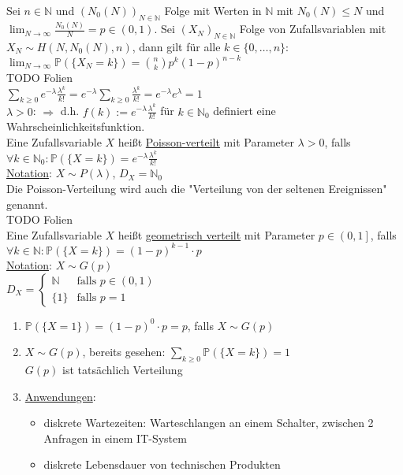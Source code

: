 \documentclass[a4paper]{article}
\newcommand{\ul}{\underline}
\begin{document}
Sei $n\in\mathbb{N}$ und $(N_0(N))_{N\in\mathbb{N}}$ Folge mit Werten in $\mathbb{N}$ mit $N_0(N)\leq N$ und $\lim_{N\rightarrow\infty}\frac{N_0(N)}{N}=p\in(0,1)$. Sei $(X_N)_{N\in\mathbb{N}}$ Folge von Zufallsvariablen mit $X_N\sim H(N,N_0(N),n)$, dann gilt für alle $k\in\{0,\dots,n\}$: $\lim_{N\rightarrow\infty}\mathbb{P}(\{X_N=k\})=\binom{n}{k}p^k(1-p)^{n-k}$\\
TODO Folien\\
$\sum_{k\geq 0}e^{-\lambda}\frac{\lambda^k}{k!}=e^{-\lambda}\sum_{k\geq 0}\frac{\lambda^k}{k!}=e^{-\lambda}e^{\lambda}=1$\\
\ul{$\lambda>0$}: $\Rightarrow$ d.h. $f(k):=e^{-\lambda}\frac{\lambda^k}{k!}$ für $k\in\mathbb{N}_0$ definiert eine Wahrscheinlichkeitsfunktion.\\
Eine Zufallsvariable $X$ heißt \ul{Poisson-verteilt} mit Parameter $\lambda>0$, falls $\forall k\in\mathbb{N}_0:\mathbb{P}(\{X=k\})=e^{-\lambda}\frac{\lambda^k}{k!}$\\
\ul{Notation}: $X\sim P(\lambda)$, $D_X=\mathbb{N}_0$\\
Die Poisson-Verteilung wird auch die "Verteilung von der seltenen Ereignissen" genannt.\\
TODO Folien\\
Eine Zufallsvariable $X$ heißt \ul{geometrisch verteilt} mit Parameter $p\in\left(0,1\right]$, falls $\forall k\in\mathbb{N}:\mathbb{P}(\{X=k\})=(1-p)^{k-1}\cdot p$\\
\ul{Notation}: $X\sim G(p)$\\
$D_X=\begin{cases}
\mathbb{N} & \text{falls }p\in (0,1)\\
\{1\} & \text{falls }p=1
\end{cases}$
\begin{enumerate}[1)]
	\item $\mathbb{P}(\{X=1\})=(1-p)^0\cdot p = p$, falls $X\sim G(p)$
	\item $X\sim G(p)$, bereits gesehen: $\sum_{k\geq0}\mathbb{P}(\{X=k\})=1$\\
	$G(p)$ ist tatsächlich Verteilung
	\item \ul{Anwendungen}:
	\begin{itemize}
		\item diskrete Wartezeiten: Warteschlangen an einem Schalter, zwischen 2 Anfragen in einem IT-System
		\item diskrete Lebensdauer von technischen Produkten
	\end{itemize}
\end{enumerate}
\end{document}
